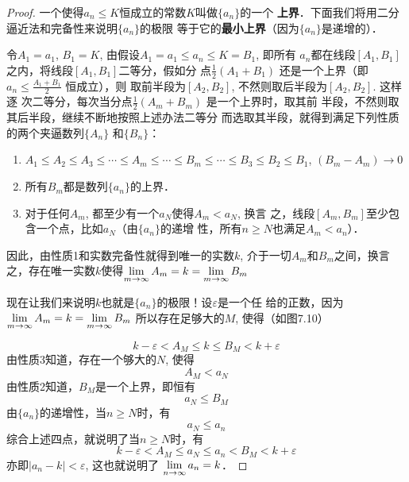 \begin{proof}
    一个使得$a_n\le K$恒成立的常数$K$叫做$\{a_n\}$的一个
\textbf{上界}．下面我们将用二分逼近法和完备性来说明$\{a_n\}$的极限
等于它的\textbf{最小上界}（因为$\{a_n\}$是递增的）．

令$A_1=a_1$, $B_1=K$, 由假设$A_1=a_1\le a_n\le K=B_1$, 即所有
$a_n$都在线段$[A_1,B_1]$之内，将线段$[A_1,B_1]$二等分，假如分
点$\frac{1}{2}(A_1+B_1)$
还是一个上界（即$a_n\le \frac{A_1+B_1}{2}$
恒成立），则
取前半段为$[A_2,B_2]$, 不然则取后半段为$[A_2,B_2]$. 这样逐
次二等分，每次当分点$\frac{1}{2}(A_m+B_m)$
是一个上界时，取其前
半段，不然则取其后半段，继续不断地按照上述办法二等分
而选取其半段，就得到满足下列性质的两个夹逼数列$\{A_n\}$
和$\{B_n\}$：

\begin{enumerate}
    \item $A_1\le A_2\le A_3\le \cdots \le A_m\le \cdots \le B_m\le \cdots\le B_3\le B_2\le B_1$, $(B_m-A_m)\to 0$
    \item 所有$B_m$都是数列$\{a_n\}$的上界．
    \item 对于任何$A_m$, 都至少有一个$a_N$使得$A_m<a_N$, 换言
之，线段$[A_m,B_m]$至少包含一个点，比如$a_N$（由$\{a_n\}$的递增
性，所有$n\ge N$也满足$A_m<a_n$）．
\end{enumerate}

因此，由性质1和实数完备性就得到唯一的实数$k$, 
介于一切$A_m$和$B_m$之间，换言之，存在唯一实数$k$使得$\displaystyle\lim_{m\to\infty}A_m=k=\displaystyle\lim_{m\to\infty}B_m$

现在让我们来说明$k$也就是$\{a_n\}$的极限！设$\varepsilon$是一个任
给的正数，因为$\displaystyle\lim_{m\to\infty}A_m=k=\displaystyle\lim_{m\to\infty}B_m$
所以存在足够大的$M$, 使得（如图7.10）
\begin{figure}[htp]
    \centering

    \caption{}
\end{figure}
\begin{equation}
    k-\varepsilon<A_M\le k\le B_M<k+\varepsilon
\end{equation}
由性质3知道，存在一个够大的$N$, 使得
\begin{equation}
    A_M<a_N    
\end{equation}
由性质2知道，$B_M$是一个上界，即恒有
\begin{equation}
    a_N\le B_M
\end{equation} 
由$\{a_n\}$的递增性，当$n\ge N$时，有
\begin{equation}
    a_N\le a_n
\end{equation} 
综合上述四点，就说明了当$n\ge N$时，有
\[k-\varepsilon<A_M\le a_N\le a_n<B_M<k+\varepsilon\]
亦即$|a_n-k|<\varepsilon$, 这也就说明了
$\displaystyle\lim_{n\to\infty}a_n=k$．
\end{proof}


